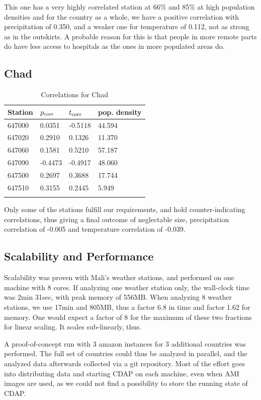 \documentclass[
10pt, %
a4paper, %
oneside, %
headinclude,footinclude, %
useAMS,
usenatbib
]{mn2e}  %
\begin{document}
This one has a very highly correlated station at 66\% and 85\% at high population densities and for the country as a whole, we have a positive correlation with precipitation of 0.350, and a weaker one for temperature of 0.112, not as strong as in the outskirts. A probable reason for this is that people in more remote parts do have less access to hospitals as the ones in more populated areas do.

\subsection{Chad}
\begin{table}
    \caption{Correlations for Chad}
    \begin{tabular}{ l l l l }
        \hline\hline
        Station & $p_{\rm corr}$ & $t_{\rm corr}$ & pop. density\\
        \hline
        647000 &  0.0351 & -0.5118 & 44.594 \\
        647020 &  0.2910 &  0.1326 & 11.370 \\
        647060 &  0.1581 &  0.5210 & 57.187 \\
        647090 & -0.4473 & -0.4917 & 48.060 \\
        647500 &  0.2697 &  0.3688 & 17.744 \\
        647510 &  0.3155 &  0.2445 &  5.949 \\
        \hline
        \label{tab:CD}
    \end{tabular}
\end{table}


Only some of the stations fulfill our requirements, and hold counter-indicating correlations, thus giving a final outcome of neglectable size, precipitation correlation of -0.005 and temperature correlation of -0.039.


\subsection{Scalability and Performance}
Scalability was proven with Mali's weather stations, and performed on one machine with 8 cores. If analyzing one weather station only, the wall-clock time was 2min 31sec, with peak memory of 556MB.
When analyzing 8 weather stations, we use 17min and 805MB, thus a factor 6.8 in time and factor 1.62 for memory. One would expect a factor of 8 for the maximum of these two fractions for linear scaling. It scales sub-linearly, thus.

A proof-of-concept run with 3 amazon instances for 3 additional countries was performed. The full set of countries could thus be analyzed in parallel, and the analyzed data afterwards collected via a git repository. Most of the effort goes into distributing data and starting CDAP on each machine, even when AMI images are used, as we could not find a possibility to store the running state of CDAP.
\end{document}
